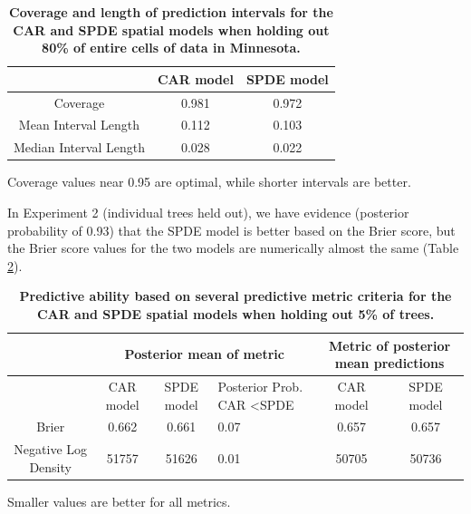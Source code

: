 \documentclass[10pt,letterpaper]{article}
\begin{document}
\begin{table}
\begin{adjustwidth}{-2.25in}{0in}
\caption{{\bf Coverage and length of prediction intervals for the CAR and SPDE spatial
models when holding out 80\% of entire cells of data in Minnesota.}}


\begin{tabular}{|c|c|c|}
\hline 
 &
{\small{}CAR model} &
{\small{}SPDE model}\tabularnewline
\hline 
{\small{}Coverage} &
{\small{}0.981} &
{\small{}0.972}\tabularnewline
\hline 
{\small{}Mean Interval Length} &
{\small{}0.112} &
{\small{}0.103}\tabularnewline
\hline 
{\small{}Median Interval Length} &
{\small{}0.028} &
{\small{}0.022}\tabularnewline
\hline 
\end{tabular}
\begin{flushleft}
Coverage values near 0.95 are optimal, while shorter intervals are
better.
\end{flushleft}

\label{tab:coverage_cell_20percent}
\end{adjustwidth}
\end{table}


In Experiment 2 (individual trees held out), we have evidence (posterior probability of 0.93)
that the SPDE model is better based on the Brier score, but the Brier
score values for the two models are numerically almost the same (Table
\ref{tab:score_tree}).



\begin{table}
\begin{adjustwidth}{-2.25in}{0in}
\caption{{\bf Predictive ability based on several predictive metric criteria for
the CAR and SPDE spatial models when holding out 5\% of trees.}}


\begin{tabular}{|c|c|c|>{\centering}p{3cm}|c|c|}
\hline 
 &
\multicolumn{3}{c|}{{\small{}Posterior mean of metric}} &
\multicolumn{2}{c|}{{\small{}Metric of posterior mean predictions}}\tabularnewline
\hline 
\hline 
 &
{\small{}CAR model} &
{\small{}SPDE model} &
{\small{}Posterior Prob. CAR \textless  SPDE} &
{\small{}CAR model} &
{\small{}SPDE model}\tabularnewline
\hline 
{\small{}Brier} &
{\small{}0.662} &
{\small{}0.661} &
{\small{}0.07} &
{\small{}0.657} &
{\small{}0.657}\tabularnewline
\hline 
{\small{}Negative Log Density} &
{\small{}51757} &
{\small{}51626} &
{\small{}0.01} &
{\small{}50705} &
{\small{}50736}\tabularnewline
\hline 
\end{tabular}
\begin{flushleft}
 Smaller values are better for all metrics.
\end{flushleft}
\label{tab:score_tree}
\end{adjustwidth}
\end{table}
\end{document}

